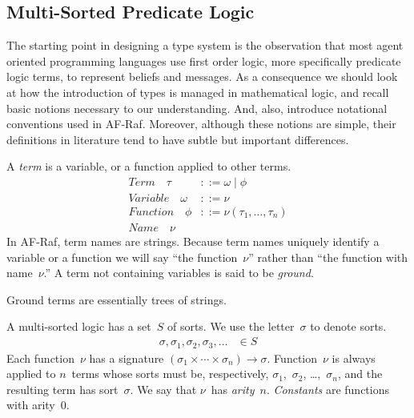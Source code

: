 \documentclass[a4paper,12pt,oneside,fleqn]{book} %
\begin{document}
{\subsection{Multi-Sorted Predicate Logic} \label{sec:multi-sorted} %

The starting point in designing a type system is the observation that most
agent oriented programming languages use first order logic, more
specifically predicate logic terms, to represent beliefs and messages. As a
consequence we should look at how the introduction of types is managed in
mathematical logic, and recall basic notions necessary to our
understanding. And, also, introduce notational conventions used in AF-Raf.
Moreover, although these notions are simple, their definitions in
literature tend to have subtle but important differences.

A \emph{term} is a variable, or a function applied to other terms.
\begin{align}
\mathit{Term}\quad\tau &::= \omega \mid \phi \\
\mathit{Variable}\quad\omega &::= \nu \\
\mathit{Function}\quad\phi &::= \nu(\tau_1,\ldots,\tau_n) \\
\mathit{Name}\quad\nu
\end{align}
In AF-Raf, term names are strings.  Because term names uniquely identify a
variable or a function we will say ``the function~$\nu$'' rather than ``the
function with name~$\nu$.'' A term not containing variables is said to be
\emph{ground}.

\begin{remark}
Ground terms are essentially trees of strings.
\end{remark}

A multi-sorted logic has a set~$S$ of sorts.  We use the letter~$\sigma$ to
denote sorts.
\begin{align}
\sigma, \sigma_1, \sigma_2, \sigma_3, \ldots &\in S
\end{align}
Each function~$\nu$ has a signature
$(\sigma_1\times\cdots\times\sigma_n)\to\sigma$.  Function~$\nu$ is always
applied to $n$~terms whose sorts must be, respectively,
$\sigma_1$,~$\sigma_2$, \dots,~$\sigma_n$, and the resulting term has
sort~$\sigma$. We say that $\nu$~has \emph{arity}~$n$. \emph{Constants} are
functions with arity~$0$.

}
\end{document}
